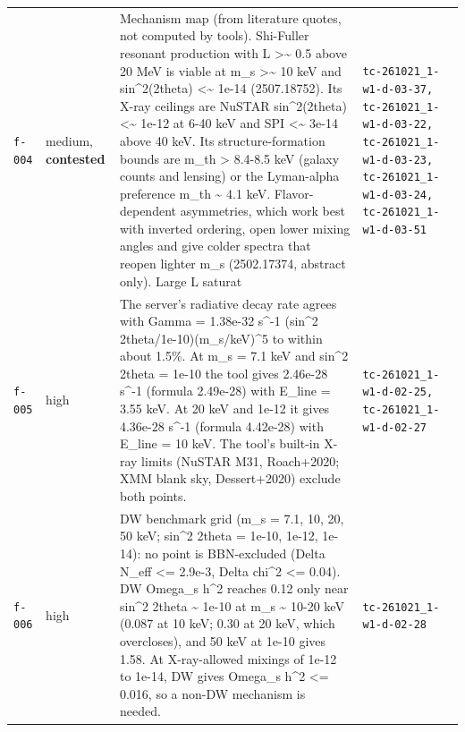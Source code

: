 \documentclass[11pt,a4paper]{article}
\begin{document}
\begin{longtable}{@{}p{}p{}p{}p{}@{}}
\texttt{f-004} & medium, \textbf{contested} & Mechanism map (from literature quotes, not computed by tools). Shi-Fuller resonant production with L \textgreater{}\textasciitilde{} 0.5 above 20 MeV is viable at m\_s \textgreater{}\textasciitilde{} 10 keV and sin\textasciicircum{}2(2theta) \textless{}\textasciitilde{} 1e-14 (2507.18752). Its X-ray ceilings are NuSTAR sin\textasciicircum{}2(2theta) \textless{}\textasciitilde{} 1e-12 at 6-40 keV and SPI \textless{}\textasciitilde{} 3e-14 above 40 keV. Its structure-formation bounds are m\_th \textgreater{} 8.4-8.5 keV (galaxy counts and lensing) or the Lyman-alpha preference m\_th \textasciitilde{} 4.1 keV. Flavor-dependent asymmetries, which work best with inverted ordering, open lower mixing angles and give colder spectra that reopen lighter m\_s (2502.17374, abstract only). Large L saturat & \texttt{tc-261021\_\allowbreak{}1-w1-d-03-37,\allowbreak{} tc-261021\_\allowbreak{}1-w1-d-03-22,\allowbreak{} tc-261021\_\allowbreak{}1-w1-d-03-23,\allowbreak{} tc-261021\_\allowbreak{}1-w1-d-03-24,\allowbreak{} tc-261021\_\allowbreak{}1-w1-d-03-51} \\
\texttt{f-005} & high & The server's radiative decay rate agrees with Gamma = 1.38e-32 s\textasciicircum{}-1 (sin\textasciicircum{}2 2theta/1e-10)(m\_s/keV)\textasciicircum{}5 to within about 1.5\%. At m\_s = 7.1 keV and sin\textasciicircum{}2 2theta = 1e-10 the tool gives 2.46e-28 s\textasciicircum{}-1 (formula 2.49e-28) with E\_line = 3.55 keV. At 20 keV and 1e-12 it gives 4.36e-28 s\textasciicircum{}-1 (formula 4.42e-28) with E\_line = 10 keV. The tool's built-in X-ray limits (NuSTAR M31, Roach+2020; XMM blank sky, Dessert+2020) exclude both points. & \texttt{tc-261021\_\allowbreak{}1-w1-d-02-25,\allowbreak{} tc-261021\_\allowbreak{}1-w1-d-02-27} \\
\texttt{f-006} & high & DW benchmark grid (m\_s = 7.1, 10, 20, 50 keV; sin\textasciicircum{}2 2theta = 1e-10, 1e-12, 1e-14): no point is BBN-excluded (Delta N\_eff \textless{}= 2.9e-3, \textbar{}Delta chi\textasciicircum{}2\textbar{} \textless{}= 0.04). DW Omega\_s h\textasciicircum{}2 reaches 0.12 only near sin\textasciicircum{}2 2theta \textasciitilde{} 1e-10 at m\_s \textasciitilde{} 10-20 keV (0.087 at 10 keV; 0.30 at 20 keV, which overcloses), and 50 keV at 1e-10 gives 1.58. At X-ray-allowed mixings of 1e-12 to 1e-14, DW gives Omega\_s h\textasciicircum{}2 \textless{}= 0.016, so a non-DW mechanism is needed. & \texttt{tc-261021\_\allowbreak{}1-w1-d-02-28} \\

\end{longtable}
\end{document}
